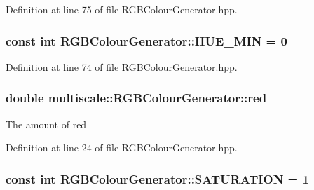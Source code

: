 Definition at line 75 of file R\-G\-B\-Colour\-Generator.\-hpp.

\hypertarget{classmultiscale_1_1RGBColourGenerator_ae31c47c9fccf50b3688728126040bc23}{
\subsubsection[{H\-U\-E\-\_\-\-M\-I\-N}]{\setlength{\rightskip}{0pt plus 5cm}const int R\-G\-B\-Colour\-Generator\-::\-H\-U\-E\-\_\-\-M\-I\-N = 0\hspace{0.3cm}{\ttfamily [static]}}}\label{classmultiscale_1_1RGBColourGenerator_ae31c47c9fccf50b3688728126040bc23}


Definition at line 74 of file R\-G\-B\-Colour\-Generator.\-hpp.

\hypertarget{classmultiscale_1_1RGBColourGenerator_a11da8c4a9ca59ea8c20177cbb5b57ceb}{
\subsubsection[{red}]{\setlength{\rightskip}{0pt plus 5cm}double multiscale\-::\-R\-G\-B\-Colour\-Generator\-::red\hspace{0.3cm}{\ttfamily [private]}}}\label{classmultiscale_1_1RGBColourGenerator_a11da8c4a9ca59ea8c20177cbb5b57ceb}
The amount of red 

Definition at line 24 of file R\-G\-B\-Colour\-Generator.\-hpp.

\hypertarget{classmultiscale_1_1RGBColourGenerator_a9442495dac9306e4172a27cba12788cc}{
\subsubsection[{S\-A\-T\-U\-R\-A\-T\-I\-O\-N}]{\setlength{\rightskip}{0pt plus 5cm}const int R\-G\-B\-Colour\-Generator\-::\-S\-A\-T\-U\-R\-A\-T\-I\-O\-N = 1\hspace{0.3cm}{\ttfamily [static]}}}\label{classmultiscale_1_1RGBColourGenerator_a9442495dac9306e4172a27cba12788cc}


